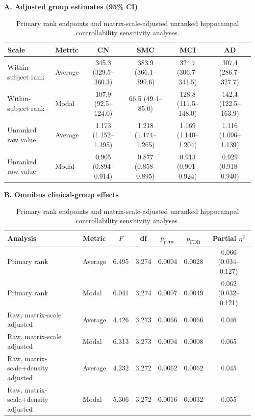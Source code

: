 \documentclass{article}
\begin{document}
\begin{table}[!htbp]
\color{blue}
\centering
\caption{Primary rank endpoints and matrix-scale-adjusted unranked hippocampal controllability sensitivity analyses.}
\label{tab:rank_raw_sensitivity}
\scriptsize
\setlength{\tabcolsep}{3.2pt}
\textbf{A. Adjusted group estimates (95\% CI)}\par\vspace{1mm}
\begin{tabular}{llcccc}
\toprule
Scale & Metric & CN & SMC & MCI & AD\\
\midrule
Within-subject rank & Average & 345.3 (329.5--360.3) & 383.9 (366.1--399.6) & 324.7 (306.7--341.5) & 307.4 (286.7--327.7)\\
Within-subject rank & Modal & 107.9 (92.5--124.0) & 66.5 (49.4--85.0) & 128.8 (111.5--148.0) & 142.4 (122.5--163.9)\\
Unranked raw value & Average & 1.173 (1.152--1.195) & 1.218 (1.174--1.265) & 1.169 (1.140--1.204) & 1.116 (1.096--1.139)\\
Unranked raw value & Modal & 0.905 (0.894--0.914) & 0.877 (0.858--0.895) & 0.913 (0.901--0.924) & 0.929 (0.918--0.940)\\
\bottomrule
\end{tabular}

\vspace{3mm}
\textbf{B. Omnibus clinical-group effects}\par\vspace{1mm}
\begin{tabular}{llccccc}
\toprule
Analysis & Metric & $F$ & df & $p_{\mathrm{perm}}$ & $p_{\mathrm{FDR}}$ & Partial $\eta^2$\\
\midrule
Primary rank & Average & 6.495 & 3,274 & 0.0004 & 0.0028 & 0.066 (0.034--0.127)\\
Primary rank & Modal & 6.041 & 3,274 & 0.0007 & 0.0049 & 0.062 (0.032--0.121)\\
Raw, matrix-scale adjusted & Average & 4.426 & 3,273 & 0.0066 & 0.0066 & 0.046\\
Raw, matrix-scale adjusted & Modal & 6.313 & 3,273 & 0.0004 & 0.0008 & 0.065\\
Raw, matrix-scale+density adjusted & Average & 4.232 & 3,272 & 0.0062 & 0.0062 & 0.045\\
Raw, matrix-scale+density adjusted & Modal & 5.306 & 3,272 & 0.0016 & 0.0032 & 0.055\\
\bottomrule
\end{tabular}


\end{table}
\end{document}
